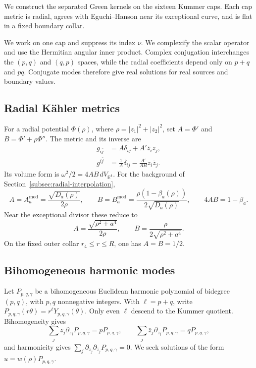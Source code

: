 \documentclass[11pt,a4paper,twoside]{article}
\numberwithin{equation}{section}
\theoremstyle{definition}
\theoremstyle{remark}
\begin{document}
We construct the separated Green kernels on the sixteen Kummer
caps. Each cap metric is radial, agrees with Eguchi--Hanson near its
exceptional curve, and is flat in a fixed boundary collar.

We work on one cap and suppress its index \(\nu\). We complexify the
scalar operator and use the Hermitian angular inner product.
Complex conjugation interchanges the \((p,q)\) and \((q,p)\) spaces,
while the radial coefficients depend only on \(p+q\) and \(pq\).
Conjugate modes therefore give real solutions for real sources and
boundary values.

\subsection{Radial K\"ahler metrics}

For a radial potential \(\Phi(\rho)\), where
\(\rho=|z_1|^2+|z_2|^2\), set \(A=\Phi'\) and
\(B=\Phi'+\rho\Phi''\). The metric and its inverse are
\begin{equation}\label{app:eq:radial-inverse}
\begin{aligned}
g_{i\bar j}&=A\delta_{ij}+A'\bar z_i z_j,\\
g^{i\bar j}&=\frac1A\delta_{ij}-\frac{A'}{AB}z_i\bar z_j.
\end{aligned}
\end{equation}
Its volume form is \(\omega^2/2=4AB\,dV_{\mathbb R^4}\).
For the background of Section~\ref{subsec:radial-interpolation},
\[
A=A_a^{\mathrm{mod}}=\frac{\sqrt{D_a(\rho)}}{2\rho},
\qquad
B=B_a^{\mathrm{mod}}=\frac{\rho(1-\beta_a(\rho))}{2\sqrt{D_a(\rho)}},
\qquad
4AB=1-\beta_a.
\]
Near the exceptional divisor these reduce to
\[
A=\frac{\sqrt{\rho^2+a^4}}{2\rho},
\qquad
B=\frac{\rho}{2\sqrt{\rho^2+a^4}}.
\]
On the fixed outer collar \(r_4\le r\le R\), one has
\(A=B=1/2\).

\subsection{Bihomogeneous harmonic modes}

Let \(P_{p,q,\gamma}\) be a bihomogeneous Euclidean harmonic polynomial
of bidegree \((p,q)\), with \(p,q\) nonnegative integers.
With \(\ell=p+q\), write
\(P_{p,q,\gamma}(r\theta)=r^\ell Y_{p,q,\gamma}(\theta)\).
Only even \(\ell\) descend to the Kummer quotient. Bihomogeneity gives
\begin{equation}\label{app:eq:Euler}
\sum_jz_j\partial_{z_j}P_{p,q,\gamma}=pP_{p,q,\gamma},
\qquad
\sum_j\bar z_j\partial_{\bar z_j}P_{p,q,\gamma}=qP_{p,q,\gamma},
\end{equation}
and harmonicity gives
\(\sum_j\partial_{z_j}\partial_{\bar z_j}P_{p,q,\gamma}=0\).
We seek solutions of the form \(u=w(\rho)P_{p,q,\gamma}\).
\end{document}
